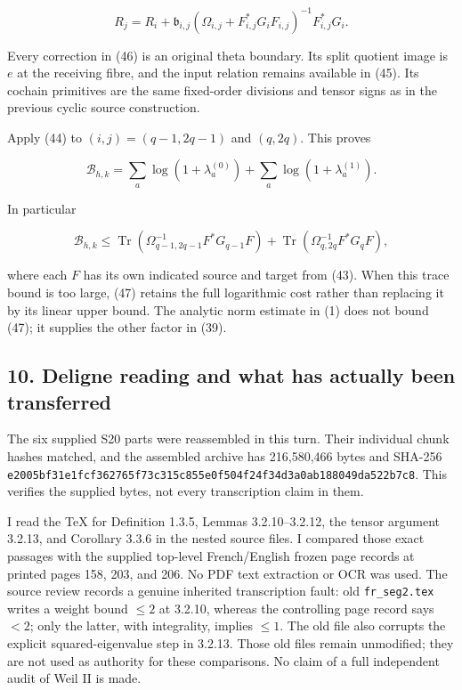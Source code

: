 \documentclass[11pt,a4paper]{article}
\begin{document}
\[
 R_j=R_i+
 \mathfrak b_{i,j}
 (\Omega_{i,j}+F_{i,j}^*G_iF_{i,j})^{-1}F_{i,j}^*G_i.                    \tag{46}
\]

Every correction in (46) is an original theta boundary. Its split quotient image is \(e\) at the receiving fibre, and the input relation remains available in (45). Its cochain primitives are the same fixed-order divisions and tensor signs as in the previous cyclic source construction.

Apply (44) to \((i,j)=(q-1,2q-1)\) and \((q,2q)\). This proves

\[
 \boxed{\mathcal B_{h,k}
 =\sum_a\log(1+\lambda_a^{(0)})
   +\sum_a\log(1+\lambda_a^{(1)}).}                                    \tag{47}
\]

In particular

\[
 \mathcal B_{h,k}\le
 \operatorname{Tr}(\Omega_{q-1,2q-1}^{-1}F^*G_{q-1}F)
 +\operatorname{Tr}(\Omega_{q,2q}^{-1}F^*G_qF),                          \tag{48}
\]

where each \(F\) has its own indicated source and target from (43). When this trace bound is too large, (47) retains the full logarithmic cost rather than replacing it by its linear upper bound. The analytic norm estimate in (1) does not bound (47); it supplies the other factor in (39).

\subsection{10. Deligne reading and what has actually been transferred}\label{zlm:endpoint-arithmetic_original--deligne-reading-and-what-has-actually-been-transferred}

The six supplied S20 parts were reassembled in this turn. Their individual chunk hashes matched, and the assembled archive has 216,580,466 bytes and SHA-256 \nolinkurl{e2005bf31e1fcf362765f73c315c855e0f504f24f34d3a0ab188049da522b7c8}. This verifies the supplied bytes, not every transcription claim in them.

I read the TeX for Definition 1.3.5, Lemmas 3.2.10--3.2.12, the tensor argument 3.2.13, and Corollary 3.3.6 in the nested source files. I compared those exact passages with the supplied top-level French/English frozen page records at printed pages 158, 203, and 206. No PDF text extraction or OCR was used. The source review records a genuine inherited transcription fault: old \nolinkurl{fr_seg2.tex} writes a weight bound \(\le2\) at 3.2.10, whereas the controlling page record says \(<2\); only the latter, with integrality, implies \(\le1\). The old file also corrupts the explicit squared-eigenvalue step in 3.2.13. Those old files remain unmodified; they are not used as authority for these comparisons. No claim of a full independent audit of Weil II is made.
\end{document}
